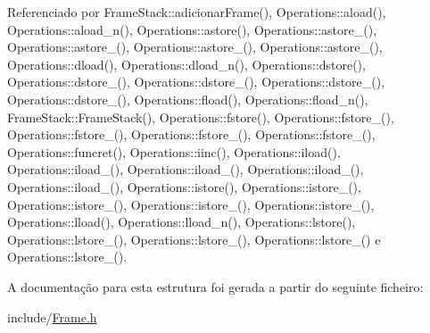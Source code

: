 Referenciado por Frame\+Stack\+::adicionar\+Frame(), Operations\+::aload(), Operations\+::aload\+\_\+n(), Operations\+::astore(), Operations\+::astore\+\_(), Operations\+::astore\+\_(), Operations\+::astore\+\_(), Operations\+::astore\+\_(), Operations\+::dload(), Operations\+::dload\+\_\+n(), Operations\+::dstore(), Operations\+::dstore\+\_(), Operations\+::dstore\+\_(), Operations\+::dstore\+\_(), Operations\+::dstore\+\_(), Operations\+::fload(), Operations\+::fload\+\_\+n(), Frame\+Stack\+::\+Frame\+Stack(), Operations\+::fstore(), Operations\+::fstore\+\_(), Operations\+::fstore\+\_(), Operations\+::fstore\+\_(), Operations\+::fstore\+\_(), Operations\+::funcret(), Operations\+::iinc(), Operations\+::iload(), Operations\+::iload\+\_(), Operations\+::iload\+\_(), Operations\+::iload\+\_(), Operations\+::iload\+\_(), Operations\+::istore(), Operations\+::istore\+\_(), Operations\+::istore\+\_(), Operations\+::istore\+\_(), Operations\+::istore\+\_(), Operations\+::lload(), Operations\+::lload\+\_\+n(), Operations\+::lstore(), Operations\+::lstore\+\_(), Operations\+::lstore\+\_(), Operations\+::lstore\+\_() e Operations\+::lstore\+\_().



A documentação para esta estrutura foi gerada a partir do seguinte ficheiro\+:\begin{DoxyCompactItemize}
\item 
include/\hyperlink{Frame_8h}{Frame.\+h}\end{DoxyCompactItemize}
